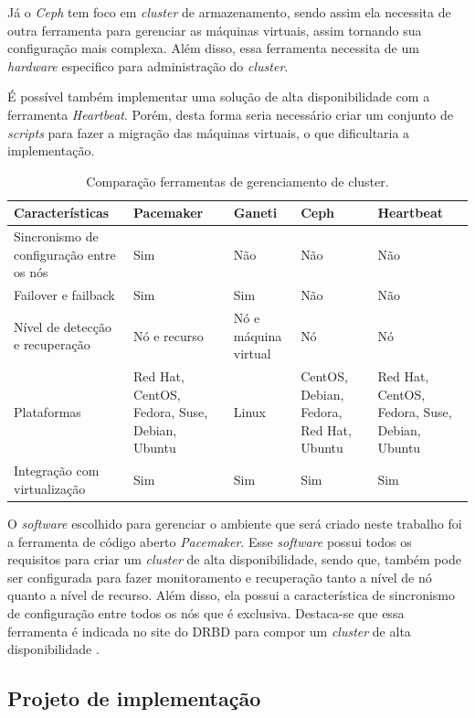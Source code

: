 Já o \textit{Ceph} tem foco em \textit{cluster} de armazenamento, sendo assim ela necessita de outra ferramenta para gerenciar as máquinas 
virtuais, assim tornando sua configuração mais complexa. Além disso, essa ferramenta necessita de um \textit{hardware} especifico para 
administração do \textit{cluster}.

É possível também implementar uma solução de alta disponibilidade com a ferramenta \textit{Heartbeat}. Porém, desta forma seria necessário criar 
um conjunto de \textit{scripts} para fazer a migração das máquinas virtuais, o que dificultaria a implementação.

\begin{table}[h!]
\caption{Comparação ferramentas de gerenciamento de cluster.}
\label{tab:clusterger}
\begin{center}
\begin{tabular}{|p{3.5cm}|p{2.7cm}|p{2cm}|p{2.7cm}|p{2.7cm}|}\hline
Características & Pacemaker & Ganeti & Ceph & Heartbeat \\\hline
Sincronismo de configuração entre os nós & Sim & Não & Não & Não \\\hline
Failover e failback & Sim & Sim & Não & Não \\\hline
Nível de detecção e recuperação & Nó e recurso & Nó e máquina virtual & Nó & Nó \\\hline
Plataformas & Red Hat, CentOS, Fedora, Suse, Debian, Ubuntu & Linux & CentOS, Debian, Fedora, Red Hat, Ubuntu & Red Hat, CentOS, Fedora, Suse, Debian, Ubuntu \\\hline
Integração com virtualização & Sim & Sim & Sim & Sim \\\hline
\end{tabular}
\end{center}
\end{table}

O \textit{software} escolhido para gerenciar o ambiente que será criado neste trabalho foi a ferramenta de código aberto \textit{Pacemaker}. 
Esse \textit{software} possui todos os requisitos para criar um \textit{cluster} de alta disponibilidade, sendo que, também pode ser configurada 
para fazer monitoramento e recuperação tanto a nível de nó quanto a nível de recurso. Além disso, ela possui a característica de sincronismo de 
configuração entre todos os nós que é exclusiva. Destaca-se que essa ferramenta é indicada no site do \ac{DRBD} para compor um \textit{cluster} 
de alta disponibilidade \cite{drbd}.

\subsection{Projeto de implementação}
\label{section:projetoimpl}


